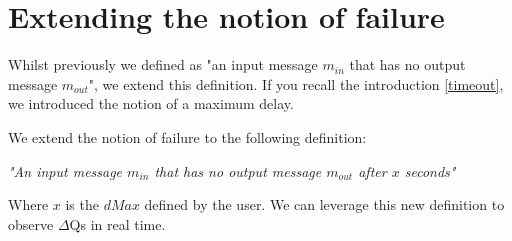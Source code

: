 \section{Extending the notion of failure}
    Whilst previously we defined as "an input message $m_{in}$ that has no output message $m_{out}$", we extend this definition. If you recall the introduction \ref{timeout}, we introduced the notion of a maximum delay.

    We extend the notion of failure to the following definition:
        \begin{center}
            \textit{"An input message $m_{in}$ that has no output message $m_{out}$ after $x$ seconds"}
        \end{center}
    Where $x$ is the $dMax$ defined by the user. We can leverage this new definition to observe $\Delta$Qs in real time.

